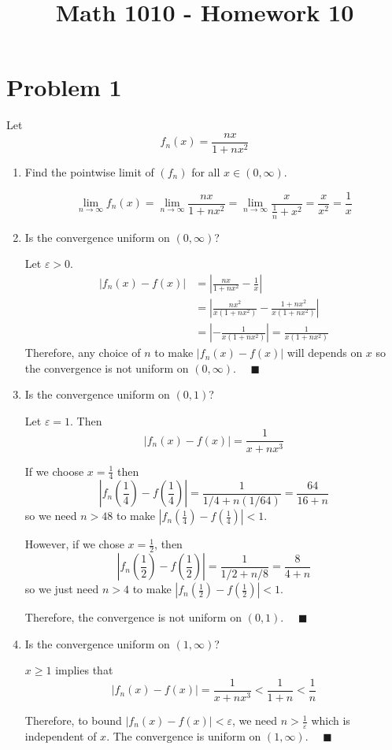 \documentclass[12pt]{article}
\title{Math 1010 - Homework 10}
\author{}
\date{}
\newcommand{\qed}{\quad \blacksquare}
\newcommand{\abs}[1]{\left\vert #1 \right\vert}
\newcommand{\ep}{\varepsilon}
\begin{document}
\maketitle
\vspace*{-1in} 


\section*{Problem 1 }
Let 
\[f_n(x)=\frac{nx}{1+nx^2}\]
\begin{enumerate}
	\item Find the pointwise limit of $(f_n)$ for all $x\in(0,\infty)$.

        \color{blue}
           \[\lim_{n \to \infty} f_n(x) = \lim_{n \to \infty} \frac{nx}{1 + nx^2} = \lim_{n \to \infty} \frac{x}{\frac{1}{n} + x^2} = \frac{x}{x^2} = \frac{1}{x}\]
        \color{black}

	\item Is the convergence uniform on $(0,\infty)$?
	
        \color{blue}
            Let $\ep > 0$. 
            \begin{align*}
                \abs{f_n(x) - f(x)} &= \abs{\frac{nx}{1+nx^2} - \frac{1}{x}}\\ 
                &= \abs{\frac{nx^2}{x(1 + nx^2)} - \frac{1 + nx^2}{x(1 + nx^2)}}\\
                &= \abs{-\frac{1}{x(1 + nx^2)}} = \frac{1}{x(1 + nx^2)}
            \end{align*}
            Therefore, any choice of $n$ to make $\abs{f_n(x) - f(x)}$ will depends on $x$ so the convergence is not uniform on $(0, \infty)$. $\qed$
        \color{black}

	\item Is the convergence uniform on $(0,1)$?
	
        \color{blue}
            Let $\ep = 1$. Then 
            \[\abs{f_n(x) - f(x)} = \frac{1}{x + nx^3}\]

            If we choose $x = \frac{1}{4}$ then 
            \[\abs{f_n(\frac{1}{4}) - f(\frac{1}{4})} = \frac{1}{1/4 + n(1/64)} = \frac{64}{16 + n}\]
            so we need $n > 48$ to make $\abs{f_n(\frac{1}{4}) - f(\frac{1}{4})} < 1$. 

            However, if we chose $x = \frac{1}{2}$, then 
            \[\abs{f_n(\frac{1}{2}) - f(\frac{1}{2})} = \frac{1}{1/2 + n/8} = \frac{8}{4 + n}\]
            so we just need $n > 4$ to make $\abs{f_n(\frac{1}{2}) - f(\frac{1}{2})} < 1$.

            Therefore, the convergence is not uniform on $(0,1)$. $\qed$
        \color{black}

	\item Is the convergence uniform on $(1,\infty)$?
	
        \color{blue}
            $x \geq 1$ implies that 
            \[\abs{f_n(x) - f(x)} = \frac{1}{x + nx^3} < \frac{1}{1 + n} < \frac{1}{n}\] 

            Therefore, to bound $\abs{f_n(x) - f(x)} < \ep$, we need $n > \frac{1}{\ep}$ which is independent of $x$. The convergence is uniform on $(1, \infty)$. $\qed$
        \color{black}
\end{enumerate}
\end{document}
